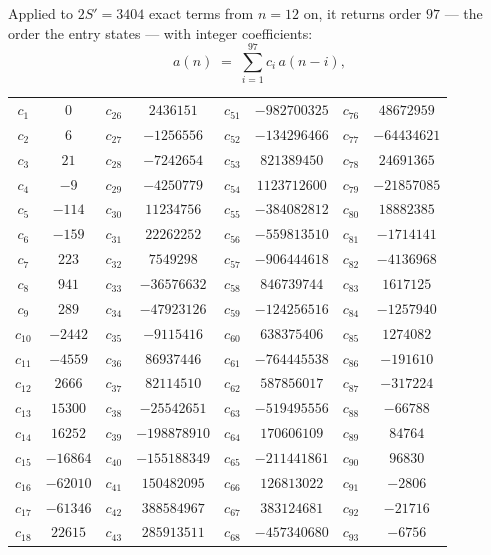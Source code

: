 \documentclass[11pt,a4paper]{article}
\theoremstyle{plain}
\theoremstyle{definition}
\begin{document}
Applied to $2S'=3404$ exact terms from $n=12$ on, it returns order $97$ --- the
order the entry states --- with integer coefficients:
\[
a(n)\;=\;\sum_{i=1}^{97}c_i\,a(n-i),
\]
\begin{center}\small
\begin{tabular}{cccccccc}
$c_{1}$ & $0$ & $c_{26}$ & $2436151$ & $c_{51}$ & $-982700325$ & $c_{76}$ & $48672959$ \\
$c_{2}$ & $6$ & $c_{27}$ & $-1256556$ & $c_{52}$ & $-134296466$ & $c_{77}$ & $-64434621$ \\
$c_{3}$ & $21$ & $c_{28}$ & $-7242654$ & $c_{53}$ & $821389450$ & $c_{78}$ & $24691365$ \\
$c_{4}$ & $-9$ & $c_{29}$ & $-4250779$ & $c_{54}$ & $1123712600$ & $c_{79}$ & $-21857085$ \\
$c_{5}$ & $-114$ & $c_{30}$ & $11234756$ & $c_{55}$ & $-384082812$ & $c_{80}$ & $18882385$ \\
$c_{6}$ & $-159$ & $c_{31}$ & $22262252$ & $c_{56}$ & $-559813510$ & $c_{81}$ & $-1714141$ \\
$c_{7}$ & $223$ & $c_{32}$ & $7549298$ & $c_{57}$ & $-906444618$ & $c_{82}$ & $-4136968$ \\
$c_{8}$ & $941$ & $c_{33}$ & $-36576632$ & $c_{58}$ & $846739744$ & $c_{83}$ & $1617125$ \\
$c_{9}$ & $289$ & $c_{34}$ & $-47923126$ & $c_{59}$ & $-124256516$ & $c_{84}$ & $-1257940$ \\
$c_{10}$ & $-2442$ & $c_{35}$ & $-9115416$ & $c_{60}$ & $638375406$ & $c_{85}$ & $1274082$ \\
$c_{11}$ & $-4559$ & $c_{36}$ & $86937446$ & $c_{61}$ & $-764445538$ & $c_{86}$ & $-191610$ \\
$c_{12}$ & $2666$ & $c_{37}$ & $82114510$ & $c_{62}$ & $587856017$ & $c_{87}$ & $-317224$ \\
$c_{13}$ & $15300$ & $c_{38}$ & $-25542651$ & $c_{63}$ & $-519495556$ & $c_{88}$ & $-66788$ \\
$c_{14}$ & $16252$ & $c_{39}$ & $-198878910$ & $c_{64}$ & $170606109$ & $c_{89}$ & $84764$ \\
$c_{15}$ & $-16864$ & $c_{40}$ & $-155188349$ & $c_{65}$ & $-211441861$ & $c_{90}$ & $96830$ \\
$c_{16}$ & $-62010$ & $c_{41}$ & $150482095$ & $c_{66}$ & $126813022$ & $c_{91}$ & $-2806$ \\
$c_{17}$ & $-61346$ & $c_{42}$ & $388584967$ & $c_{67}$ & $383124681$ & $c_{92}$ & $-21716$ \\
$c_{18}$ & $22615$ & $c_{43}$ & $285913511$ & $c_{68}$ & $-457340680$ & $c_{93}$ & $-6756$ \\

\end{tabular}
\end{center}
\end{document}
